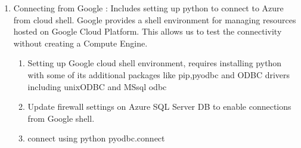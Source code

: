 \documentclass[journal]{hybrid-cloud}
\begin{document}
\begin{enumerate}
\begin{enumerate}
\begin{enumerate}
 		\end{enumerate}
 		\item Connecting from Google : Includes setting up python to connect to Azure from cloud shell. Google provides a shell environment for managing resources hosted on Google Cloud Platform. This allows us to test the connectivity without creating a Compute Engine.
 		\begin{enumerate}
 			\item Setting up Google cloud shell environment, requires installing python with some of its additional packages like pip,pyodbc and ODBC drivers including unixODBC and MSsql odbc 
 			\item Update firewall settings on Azure SQL Server DB to enable connections from Google shell.
 			\item connect using python pyodbc.connect  
 		\end{enumerate}
	 \end{enumerate}

 
\end{enumerate}
%
%

\end{document}
